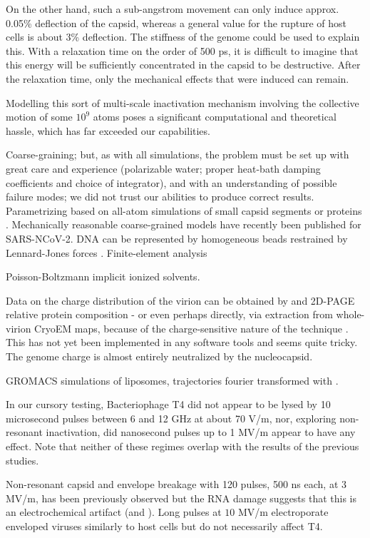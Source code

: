 \documentclass[paper.tex]{subfiles}
\begin{document}
\begin{multicols}{1}
On the other hand, such a sub-angstrom movement can only induce approx. 0.05\% deflection of the capsid, whereas a general value for the rupture of host cells is about 3\% deflection\cite{Electromechanical1989}. The stiffness of the genome could be used to explain this. With a relaxation time on the order of 500 ps, it is difficult to imagine that this energy will be sufficiently concentrated in the capsid to be destructive. After the relaxation time, only the mechanical effects that were induced can remain.

Modelling this sort of multi-scale inactivation mechanism involving the collective motion of some $10^9$ atoms poses a significant computational and theoretical hassle, which has far exceeded our capabilities. 

Coarse-graining; but, as with all simulations, the problem must be set up with great care and experience (polarizable water; proper heat-bath damping coefficients and choice of integrator)\cite{Membrane2016}, and with an understanding of possible failure modes; we did not trust our abilities to produce correct results. Parametrizing based on all-atom simulations of small capsid segments or proteins \cite{Elucidating2009}. Mechanically reasonable coarse-grained models have recently been published for SARS-NCoV-2\cite{Multiscale2020}. DNA can be represented by homogeneous beads restrained by Lennard-Jones forces \cite{Communication2013}. Finite-element analysis \cite{Finite2008}

Poisson-Boltzmann implicit ionized solvents.


Data on the charge distribution of the virion can be obtained by and 2D-PAGE relative protein composition - or even perhaps directly, via extraction from whole-virion CryoEM maps, because of the charge-sensitive nature of the technique \cite{Identification2018}\cite{Electrostatic2020}. This has not yet been implemented in any software tools and seems quite tricky. The genome charge is almost entirely neutralized by the nucleocapsid. 

GROMACS simulations of liposomes, trajectories fourier transformed with \cite{TRAVIS2011}.

In our cursory testing, Bacteriophage T4 did not appear to be lysed by 10 microsecond pulses between 6 and 12 GHz at about 70 V/m, nor, exploring non-resonant inactivation, did nanosecond pulses up to 1 MV/m appear to have any effect. Note that neither of these regimes overlap with the results of the previous studies.

Non-resonant capsid and envelope breakage with 120 pulses, 500 ns each, at 3 MV/m, has been previously observed\cite{Inactivation1990} but the RNA damage suggests that this is an electrochemical artifact \cite{Formation1996} (and \cite{Microwave1987}). Long pulses at $10$ MV/m electroporate enveloped viruses similarly to host cells\cite{AC2017} but do not necessarily affect T4\cite{Manipulation2013}. 


\end{multicols}
\end{document}
